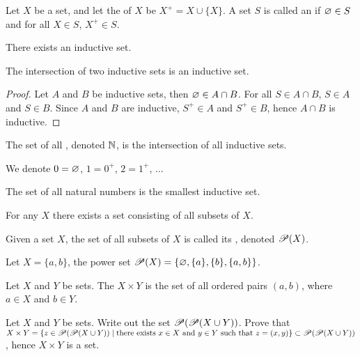 \documentclass[10pt]{article}
\begin{document}
\begin{definition}
    Let $X$ be a set, and let the  of $X$ be ${X}^{+}=X\cup\{X\}$. A set $S$ is called an  if $\varnothing\in S$ and for all $X\in S$, ${X}^{+}\in S$.
\end{definition}
\begin{Axiom of infinity}
    There exists an inductive set.
\end{Axiom of infinity}
\begin{proposition}
    The intersection of two inductive sets is an inductive set.
\end{proposition}
\begin{proof}
    Let $A$ and $B$ be inductive sets, then $\varnothing\in A\cap B$. For all $S\in A\cap B$, $S\in A$ and $S\in B$. Since $A$ and $B$ are inductive, ${S}^{+}\in A$ and ${S}^{+}\in B$, hence $A\cap B$ is inductive.
\end{proof}
\par
\begin{definition}
    The set of all , denoted $\mathbb{N}$, is the intersection of all inductive sets. 
\end{definition}
\par
We denote $0=\varnothing$, $1={0}^{+}$, $2={1}^{+}$, $\dots$
\begin{problem}
    The set of all natural numbers is the smallest inductive set.
\end{problem}
\begin{Axiom of power set}
    For any $X$ there exists a set consisting of all subsets of $X$.
\end{Axiom of power set}
\begin{definition}
    Given a set $X$, the set of all subsets of $X$ is called its , denoted $\mathscr{P}(X)$.
\end{definition}
\begin{example}
    Let $X=\{a,b\}$, the power set $\mathscr{P}(X)=\{\varnothing,\{a\},\{b\},\{a,b\}\}$.
\end{example}
\begin{definition}
    Let $X$ and $Y$ be sets. The  $X\times Y$ is the set of all ordered pairs $(a,b)$, where $a\in X$ and $b\in Y$.
\end{definition}
\begin{problem}
    Let $X$ and $Y$ be sets. Write out the set $\mathscr{P}(\mathscr{P}(X\cup Y))$. Prove that $X\times Y=\{z\in\ps(\ps(X\cup Y))\mid\text{there exists}\ x\in X\ \text{and}\ y\in Y\ \text{such that}\ z=(x,y)\}\sub\ps(\ps(X\cup Y))$, hence $X\times Y$ is a set.
\end{problem}
\end{document}
